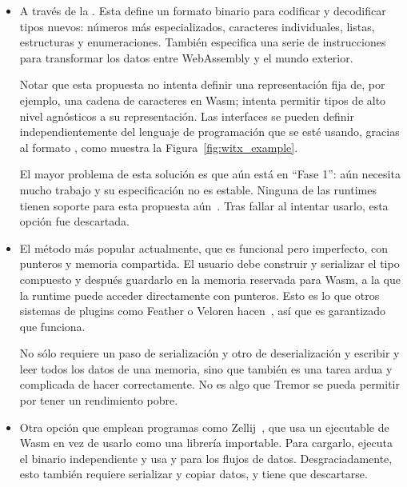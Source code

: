 \begin{itemize}
    \item A través de la . Esta define un formato
        binario para codificar y decodificar tipos nuevos: números más
        especializados, caracteres individuales, listas, estructuras y
        enumeraciones. También especifica una serie de instrucciones para
        transformar los datos entre WebAssembly y el mundo exterior.

        Notar que esta propuesta no intenta definir una representación fija de,
        por ejemplo, una cadena de caracteres en Wasm; intenta permitir tipos de
        alto nivel agnósticos a su representación. Las interfaces se pueden
        definir independientemente del lenguaje de programación que se esté
        usando, gracias al formato , como muestra la
        Figura~\ref{fig:witx_example}.

        El mayor problema de esta solución es que aún está en ``Fase 1'': aún
        necesita mucho trabajo y su especificación no es estable. Ninguna de las
        runtimes tienen soporte para esta propuesta
        aún~\cite{interfacetypeswasmtime}\cite{interfacetypeswasmer}. Tras
        fallar al intentar usarlo, esta opción fue descartada.

    \item El método más popular actualmente, que es funcional pero imperfecto,
        con punteros y memoria compartida. El usuario debe construir y
        serializar el tipo compuesto y después guardarlo en la memoria reservada
        para Wasm, a la que la runtime puede acceder directamente con punteros.
        Esto es lo que otros sistemas de plugins como Feather o Veloren
        hacen~\cite{featherpluginsystem}\cite{velorenpluginsystem}, así que es
        garantizado que funciona.

        No sólo requiere un paso de serialización y otro de deserialización y
        escribir y leer todos los datos de una memoria, sino que también es una
        tarea ardua y complicada de hacer correctamente. No es algo que Tremor
        se pueda permitir por tener un rendimiento pobre.

    \item Otra opción que emplean programas como
        Zellij~\cite{zellijpluginsystem}, que usa un ejecutable de Wasm en vez
        de usarlo como una librería importable. Para cargarlo, ejecuta el
        binario independiente y usa \stdin y \stdout para los flujos de datos.
        Desgraciadamente, esto también requiere serializar y copiar datos, y
        tiene que descartarse.

\end{itemize}

